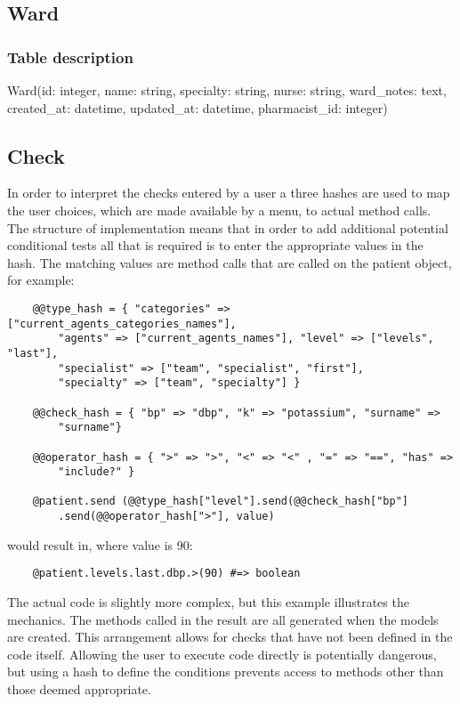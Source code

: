 \documentclass[letterpaper]{amsart}
\begin{document}
\subsection{Ward}

\subsubsection{Table description}
Ward(id: integer, name: string, specialty: string, nurse: string, ward\_notes: text, created\_at: datetime, updated\_at: datetime, pharmacist\_id: integer)
\subsection{Check}
In order to interpret the checks entered by a user a three hashes are used to map the user choices, which are made available by a menu, to actual method calls.  The structure of implementation means that in order to add additional potential conditional tests all that is required is to enter the appropriate values in the hash.  The matching values are method calls that are called on the patient object, for example:\\
\begin{verbatim}
    @@type_hash = { "categories" => ["current_agents_categories_names"], 
	    "agents" => ["current_agents_names"], "level" => ["levels", "last"], 
	    "specialist" => ["team", "specialist", "first"], 
	    "specialty" => ["team", "specialty"] }  

    @@check_hash = { "bp" => "dbp", "k" => "potassium", "surname" => 
	    "surname"}

    @@operator_hash = { ">" => ">", "<" => "<" , "=" => "==", "has" => 
	    "include?" }

    @patient.send (@@type_hash["level"].send(@@check_hash["bp"]
	    .send(@@operator_hash[">"], value)

\end{verbatim}
would result in, where value is 90:\\
\begin{verbatim}
    @patient.levels.last.dbp.>(90) #=> boolean

\end{verbatim}
The actual code is slightly more complex, but this example illustrates the mechanics.  The methods called in the result are all generated when the models are created.  This arrangement allows for checks that have not been defined in the code itself.  Allowing the user to execute code directly is potentially dangerous, but using a hash to define the conditions prevents access to methods other than those deemed appropriate.
\end{document}
